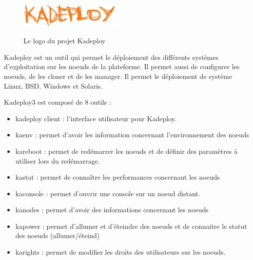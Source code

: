 \documentclass[a4paper, 10pt, onecolumn]{report}
\begin{document}
		\begin{figure}[!h]
			\centering
   			\includegraphics[width=5cm,height=2cm]{kadeploy.jpeg}
   			\caption{Le logo du projet Kadeploy}
    		\label{fig:kadeploy}
		\end{figure} 
			Kadeploy est un outil qui permet le déploiement des différents systèmes d'exploitation sur les noeuds de la plateforme. Il permet aussi de configurer les noeuds, de les cloner et de les manager. Il permet le déploiement de système Linux, BSD, Windows et Solaris.
			
			Kadeploy3 est composé de 8 outils  : \\
				\begin{itemize}
					\item kadeploy client : l'interface utilisateur pour Kadeploy.
					\item kaenv : permet d'avoir les information concernant l'environnement des noeuds 
					\item kareboot : permet de redémarrer les noeuds et de définir des paramètres à utiliser lors du redémarrage.
					\item kastat : permet de conna\^itre les performances concernant les noeuds
					\item kaconsole : permet d'ouvrir une console sur un noeud distant.
					\item kanodes : permet d'avoir des informations concernant les noeuds 
					\item kapower : permet  d'allumer et d'éteindre des noeuds et de connaitre le statut des noeuds (allumer/éteind)
					\item karights : permet de modifier les droits des utilisateurs sur les noeuds.
				\end{itemize}
\end{document}
